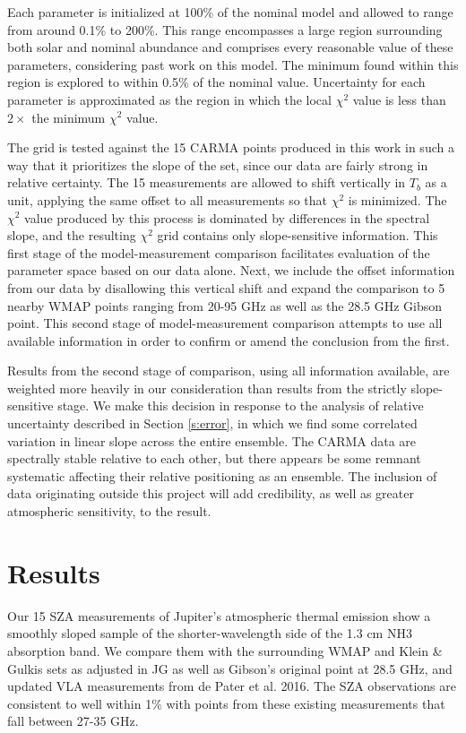 \documentclass{article}
\begin{document}
	Each parameter is initialized at 100\% of the nominal model and allowed to range from around 0.1\% to 200\%.
	This range encompasses a large region surrounding both solar and nominal abundance and comprises every reasonable value of these parameters, considering past work on this model.
	The minimum found within this region is explored to within 0.5\% of the nominal value.
	Uncertainty for each parameter is approximated as the region in which the local $\chi^{2}$ value is less than $2\times$ the minimum $\chi^{2}$ value.

	The grid is tested against the 15 CARMA points produced in this work in such a way that it prioritizes the slope of the set, since our data are fairly strong in relative certainty.
	The 15 measurements are allowed to shift vertically in $T_b$ as a unit, applying the same offset to all measurements so that $\chi^{2}$ is minimized.
	The $\chi^{2}$ value produced by this process is dominated by differences in the spectral slope, and the resulting $\chi^{2}$ grid contains only slope-sensitive information.
	This first stage of the model-measurement comparison facilitates evaluation of the parameter space based on our data alone.
	Next, we include the offset information from our data by disallowing this vertical shift and expand the comparison to 5 nearby WMAP points ranging from 20-95 GHz as well as the 28.5 GHz Gibson point.
	This second stage of model-measurement comparison attempts to use all available information in order to confirm or amend the conclusion from the first.

	Results from the second stage of comparison, using all information available, are weighted more heavily in our consideration than results from the strictly slope-sensitive stage.
	We make this decision in response to the analysis of relative uncertainty described in Section \ref{s:error}, in which we find some correlated variation in linear slope across the entire ensemble.
	The CARMA data are spectrally stable relative to each other, but there appears be some remnant systematic affecting their relative positioning as an ensemble.
	The inclusion of data originating outside this project will add credibility, as well as greater atmospheric sensitivity, to the result.


\section{Results} \label{s:results}

	Our 15 SZA measurements of Jupiter's atmospheric thermal emission show a smoothly sloped sample of the shorter-wavelength side of the 1.3 cm NH3 absorption band.
	We compare them with the surrounding WMAP and Klein \& Gulkis sets as adjusted in JG as well as Gibson's original point at 28.5 GHz, and updated VLA measurements from de Pater et al. 2016.
	The SZA observations are consistent to well within 1\% with points from these existing measurements that fall between 27-35 GHz.
\end{document}
